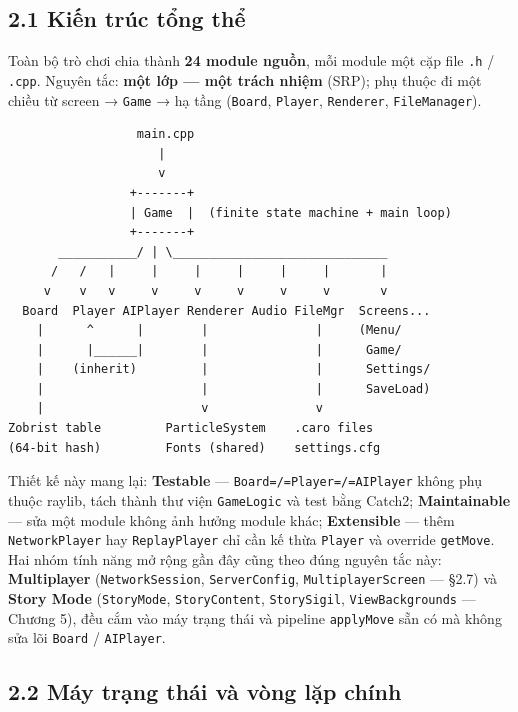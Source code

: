 \documentclass[11pt,a4paper]{article}
\begin{document}
\subsection{2.1 Kiến trúc tổng thể}
\label{sec:org7335809}

Toàn bộ trò chơi chia thành \textbf{24 module nguồn}, mỗi module một cặp file \texttt{.h} / \texttt{.cpp}. Nguyên tắc: \textbf{một lớp — một trách nhiệm} (SRP); phụ thuộc đi một chiều từ screen → \texttt{Game} → hạ tầng (\texttt{Board}, \texttt{Player}, \texttt{Renderer}, \texttt{FileManager}).

\begin{verbatim}
                  main.cpp
                     |
                     v
                 +-------+
                 | Game  |  (finite state machine + main loop)
                 +-------+
       ___________/ | \______________________________
      /   /   |     |     |     |     |     |       |
     v    v   v     v     v     v     v     v       v
  Board  Player AIPlayer Renderer Audio FileMgr  Screens...
    |      ^      |        |               |     (Menu/
    |      |______|        |               |      Game/
    |    (inherit)         |               |      Settings/
    |                      |               |      SaveLoad)
    |                      v               v
Zobrist table         ParticleSystem    .caro files
(64-bit hash)         Fonts (shared)    settings.cfg
\end{verbatim}

Thiết kế này mang lại: \textbf{Testable} — \texttt{Board=/=Player=/=AIPlayer} không phụ thuộc raylib, tách thành thư viện \texttt{GameLogic} và test bằng Catch2; \textbf{Maintainable} — sửa một module không ảnh hưởng module khác; \textbf{Extensible} — thêm \texttt{NetworkPlayer} hay \texttt{ReplayPlayer} chỉ cần kế thừa \texttt{Player} và override \texttt{getMove}. Hai nhóm tính năng mở rộng gần đây cũng theo đúng nguyên tắc này: \textbf{Multiplayer} (\texttt{NetworkSession}, \texttt{ServerConfig}, \texttt{MultiplayerScreen} — §2.7) và \textbf{Story Mode} (\texttt{StoryMode}, \texttt{StoryContent}, \texttt{StorySigil}, \texttt{ViewBackgrounds} — Chương 5), đều cắm vào máy trạng thái và pipeline \texttt{applyMove} sẵn có mà không sửa lõi \texttt{Board} / \texttt{AIPlayer}.
\subsection{2.2 Máy trạng thái và vòng lặp chính}
\label{sec:org52420de}
\end{document}
